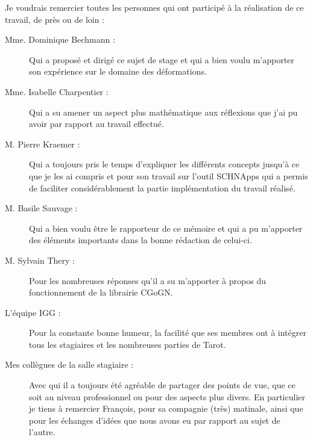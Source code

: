 


\begin{acknowledgementslong}

Je voudrais remercier toutes les personnes qui ont participé à la réalisation
de ce travail, de près ou de loin :

\begin{description} 

\item[Mme. Dominique Bechmann : ] Qui a proposé et dirigé ce sujet
de stage et qui a bien voulu m'apporter son expérience sur le domaine des
déformations.

\item[Mme. Isabelle Charpentier : ] Qui a su amener un aspect plus
mathématique aux réflexions que j'ai pu avoir par rapport au travail effectué.

\item[M. Pierre Kraemer : ] Qui a toujours pris le temps
d'expliquer les différents concepts jusqu'à ce que je les ai compris et pour
son travail sur l'outil SCHNApps qui a permis de faciliter considérablement
la partie implémentation du travail réalisé.

\item[M. Basile Sauvage : ] Qui a bien voulu être le rapporteur
de ce mémoire et qui a pu m'apporter des éléments importants dans la bonne
rédaction de celui-ci.

\item[M. Sylvain Thery : ] Pour les nombreuses réponses qu'il a
su m'apporter à propos du fonctionnement de la librairie CGoGN.

\item[L'équipe IGG : ] Pour la constante bonne humeur, la facilité
que ses membres ont à intégrer tous les stagiaires et les nombreuses parties
de Tarot.

\item[Mes collègues de la salle stagiaire : ] Avec qui il a toujours été
agréable de partager des points de vue, que ce soit au niveau professionnel ou
pour des aspects plus divers. En particulier je tiens à remercier François,
pour sa compagnie (très) matinale, ainsi que pour les échanges d'idées que
nous avons eu par rapport au sujet de l'autre.

\end{description}

\end{acknowledgementslong}


